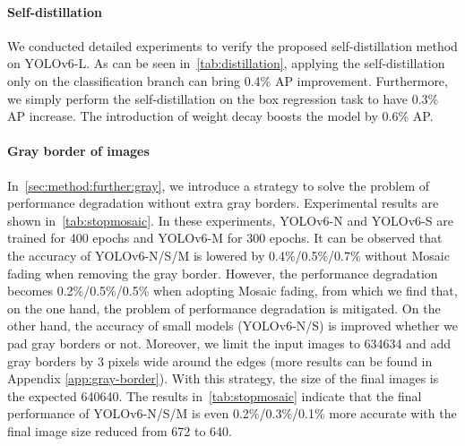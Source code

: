 \documentclass[10pt,twocolumn,letterpaper]{article}
\begin{document}
\begin{table}[ht]
\centering
{}
\caption{Ablation study on the self-distillation.}
\label{tab:distillation}
\end{table}
\paragraph{Self-distillation}
We conducted detailed experiments to verify the proposed self-distillation method on YOLOv6-L. As can be seen in~\cref{tab:distillation}, applying the self-distillation only on the classification branch can bring 0.4\% AP improvement. Furthermore, we simply perform the self-distillation on the box regression task to have 0.3\% AP increase. The introduction of weight decay boosts the model by 0.6\% AP.

\paragraph{Gray border of images}
  In~\cref{sec:method:further:gray}, we introduce a strategy to solve the problem of performance degradation without extra gray borders. Experimental results are shown in~\cref{tab:stopmosaic}. In these experiments, YOLOv6-N and YOLOv6-S are trained for 400 epochs and YOLOv6-M for 300 epochs. It can be observed that the accuracy of YOLOv6-N/S/M is lowered by 0.4\%/0.5\%/0.7\% without Mosaic fading when removing the gray border. However, the performance degradation becomes 0.2\%/0.5\%/0.5\% when adopting Mosaic fading, from which we find that, on the one hand, the problem of performance degradation is mitigated. On the other hand, the accuracy of small models (YOLOv6-N/S) is improved whether we pad gray borders or not. Moreover, we limit the input images to 634634 and add gray borders by 3 pixels wide around the edges (more results can be found in Appendix \ref{app:gray-border}). With this strategy, the size of the final images is the expected 640640. The results in~\cref{tab:stopmosaic} indicate that the final performance of YOLOv6-N/S/M is even 0.2\%/0.3\%/0.1\% more accurate with the final image size reduced from 672 to 640.
  
\end{document}

